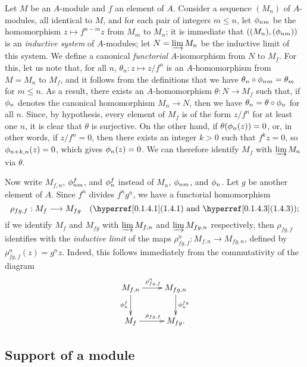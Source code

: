 \begin{env}[1.6.1]
\label{0.1.6.1}
Let $M$ be an $A$-module and $f$ an element of $A$.
Consider a sequence $(M_n)$ of $A$-modules, all identical to $M$, and for each pair of integers $m\leq n$, let $\phi_{nm}$ be the homomorphism $z\mapsto f^{n-m}z$ from $M_m$ to $M_n$; it is immediate that $((M_n),(\phi_{nm}))$ is an \emph{inductive system} of $A$-modules; let $N=\varinjlim M_n$ be the inductive limit of this system.
We define a canonical \emph{functorial} $A$-isomorphism from $N$ to $M_f$.
For this, let us note that, for all $n$, $\theta_n:z\mapsto z/f^n$ is an $A$-homomorphism from $M=M_n$ to $M_f$, and it follows from the definitions that we have $\theta_n\circ\phi_{nm}=\theta_m$ for $m\leq n$.
As a result, there exists an $A$-homomorphism $\theta:N\to M_f$ such that, if $\phi_n$ denotes the canonical homomorphism $M_n\to N$, then we have $\theta_n=\theta\circ\phi_n$ for all $n$.
Since, by hypothesis, every element of $M_f$ is of the form $z/f^n$ for at least one $n$, it is clear that $\theta$ is surjective.
On the other hand, if $\theta(\phi_n(z))=0$, or, in other words, if $z/f^n=0$, then there exists an integer $k>0$ such that $f^k z=0$, so $\phi_{n+k,n}(z)=0$, which gives $\phi_n(z)=0$.
We can therefore identify $M_f$ with $\varinjlim M_n$ via $\theta$.
\end{env}

\begin{env}[1.6.2]
\label{0.1.6.2}
Now write $M_{f,n}$, $\phi_{nm}^f$, and $\phi_n^f$ instead of $M_n$, $\phi_{nm}$, and $\phi_n$.
Let $g$ be another element of $A$.
Since $f^n$ divides $f^n g^n$, we have a functorial homomorphism
\[
  \rho_{fg,f}:M_f\to M_{fg}\quad(\sref{0.1.4.1}\text{ and }\sref{0.1.4.3});
\]
if
we identify $M_f$ and $M_{fg}$ with $\varinjlim M_{f,n}$ and $\varinjlim M_{fg,n}$ respectively, then $\rho_{fg,f}$ identifies with the \emph{inductive limit} of the maps $\rho_{fg,f}^n:M_{f,n}\to M_{fg,n}$, defined by $\rho_{fg,f}^n(z)=g^n z$.
Indeed, this follows immediately from the commutativity of the diagram
\[
  \xymatrix{
    M_{f,n}\ar[r]^{\rho_{fg,f}^n}\ar[d]_{\vphi_n^f} &
    M_{fg,n}\ar[d]^{\vphi_n^{fg}}\\
    M_f\ar[r]^{\rho_{fg,f}} &
    M_{fg}.
  }
\]
\end{env}

\subsection{Support of a module}
\label{subsection:support-of-module}

